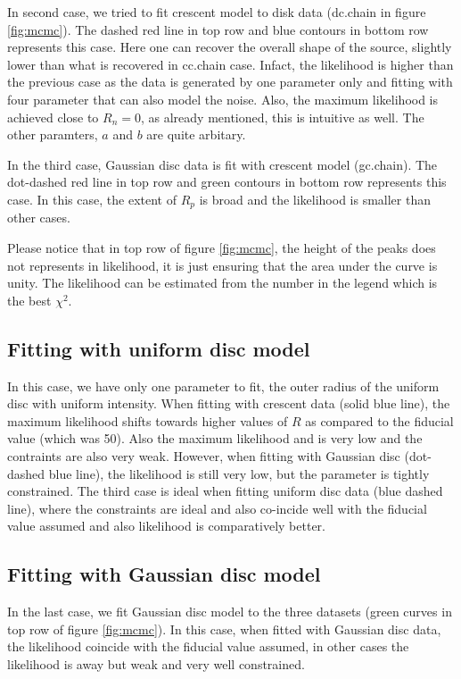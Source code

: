 In second case, we tried to fit crescent model to disk data (dc.chain in figure \ref{fig:mcmc}). The dashed red line in top row and blue contours in bottom row represents this case. Here one can recover the overall shape of the source, slightly lower than what is recovered in cc.chain case. Infact, the likelihood is higher than the previous case as the data is generated by one parameter only and fitting with four parameter that can also model the noise. Also, the maximum likelihood is achieved close to $R_n = 0$, as already mentioned, this is intuitive as well. The other paramters, $a$ and $b$ are quite arbitary. 

In the third case, Gaussian disc data is fit with crescent model (gc.chain). The dot-dashed red line in top row and green contours in bottom row represents this case. In this case, the extent of $R_p$ is broad and the likelihood is smaller than other cases.

Please notice that in top row of figure \ref{fig:mcmc}, the height of the peaks does not represents in likelihood, it is just ensuring that the area under the curve is unity. The likelihood can be estimated from the number in the legend which is the best $\chi^2$.

\subsection{Fitting with uniform disc model}
In this case, we have only one parameter to fit, the outer radius of the uniform disc with uniform intensity. When fitting with crescent data (solid blue line), the maximum likelihood shifts towards higher values of $R$ as compared to the fiducial value (which was 50). Also the maximum likelihood and is very low and the contraints are also very weak. However, when fitting with Gaussian disc (dot-dashed blue line), the likelihood is still very low, but the parameter is tightly constrained. The third case is ideal when fitting uniform disc data (blue dashed line), where the constraints are ideal and also co-incide well with the fiducial value assumed and also likelihood is comparatively better. 


\subsection{Fitting with Gaussian disc model}
In the last case, we fit Gaussian disc model to the three datasets (green curves in top row of figure \ref{fig:mcmc}). In this case, when fitted with Gaussian disc data, the likelihood coincide with the fiducial value assumed, in other cases the likelihood is away but weak and very well constrained. 


